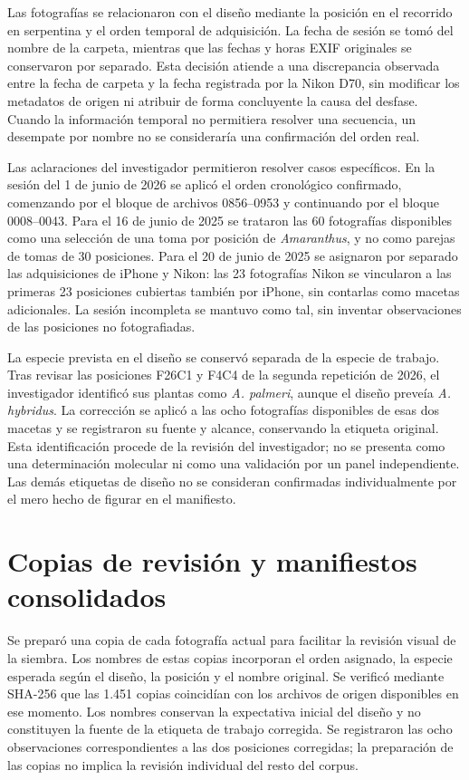 Las fotografías se relacionaron con el diseño mediante la posición en el recorrido en serpentina y el orden temporal de adquisición. La fecha de sesión se tomó del nombre de la carpeta, mientras que las fechas y horas EXIF originales se conservaron por separado. Esta decisión atiende a una discrepancia observada entre la fecha de carpeta y la fecha registrada por la Nikon D70, sin modificar los metadatos de origen ni atribuir de forma concluyente la causa del desfase. Cuando la información temporal no permitiera resolver una secuencia, un desempate por nombre no se consideraría una confirmación del orden real.

Las aclaraciones del investigador permitieron resolver casos específicos. En la sesión del 1 de junio de 2026 se aplicó el orden cronológico confirmado, comenzando por el bloque de archivos 0856--0953 y continuando por el bloque 0008--0043. Para el 16 de junio de 2025 se trataron las 60 fotografías disponibles como una selección de una toma por posición de \textit{Amaranthus}, y no como parejas de tomas de 30 posiciones. Para el 20 de junio de 2025 se asignaron por separado las adquisiciones de iPhone y Nikon: las 23 fotografías Nikon se vincularon a las primeras 23 posiciones cubiertas también por iPhone, sin contarlas como macetas adicionales. La sesión incompleta se mantuvo como tal, sin inventar observaciones de las posiciones no fotografiadas.

La especie prevista en el diseño se conservó separada de la especie de trabajo. Tras revisar las posiciones F26C1 y F4C4 de la segunda repetición de 2026, el investigador identificó sus plantas como \textit{A. palmeri}, aunque el diseño preveía \textit{A. hybridus}. La corrección se aplicó a las ocho fotografías disponibles de esas dos macetas y se registraron su fuente y alcance, conservando la etiqueta original. Esta identificación procede de la revisión del investigador; no se presenta como una determinación molecular ni como una validación por un panel independiente. Las demás etiquetas de diseño no se consideran confirmadas individualmente por el mero hecho de figurar en el manifiesto.

\section{Copias de revisión y manifiestos consolidados}

Se preparó una copia de cada fotografía actual para facilitar la revisión visual de la siembra. Los nombres de estas copias incorporan el orden asignado, la especie esperada según el diseño, la posición y el nombre original. Se verificó mediante SHA-256 que las 1.451 copias coincidían con los archivos de origen disponibles en ese momento. Los nombres conservan la expectativa inicial del diseño y no constituyen la fuente de la etiqueta de trabajo corregida. Se registraron las ocho observaciones correspondientes a las dos posiciones corregidas; la preparación de las copias no implica la revisión individual del resto del corpus.

